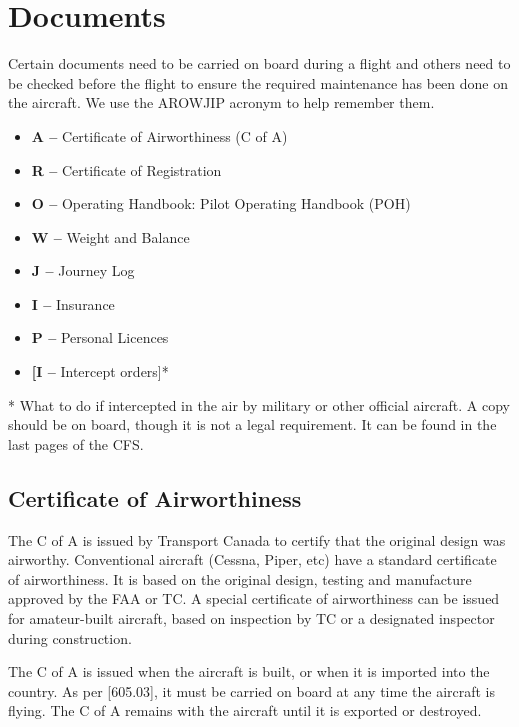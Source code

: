 \documentclass[12pt,letterpaper]{article}
\begin{document}
    \section{Documents}
    \begin{samepage}
    
    Certain documents need to be carried on board during a flight and others need to be checked before the flight to ensure the required maintenance has been done on the aircraft. We use the AROWJIP acronym to help remember them.
    
    \begin{itemize}
        \item \textbf{A --} Certificate of Airworthiness (C of A)
        \item \textbf{R --}  Certificate of Registration 
        \item \textbf{O --}  Operating Handbook:  Pilot Operating Handbook (POH)
        \item \textbf{W --}  Weight and Balance
        \item \textbf{J --}   Journey Log
        \item \textbf{I --}  Insurance
        \item \textbf{P --}  Personal Licences
        \item \textbf{[I --}   Intercept orders]*
    \end{itemize}
    
    * What to do if intercepted in the air by military or other official aircraft. A copy should be on board, though it is not a legal requirement. It can be found in the last pages of the CFS.
    \end{samepage}

    \subsection{Certificate of Airworthiness}

    The C of A is issued by Transport Canada to certify that the original design was airworthy.  Conventional aircraft (Cessna, Piper, etc) have a standard certificate of airworthiness. It is based on the original design, testing and manufacture approved by the FAA or TC. A special certificate of airworthiness can be issued for amateur-built aircraft, based on inspection by TC or a designated inspector during construction.  

    The C of A is issued when the aircraft is built, or when it is imported into the country. As per [605.03], it must be carried on board at any time the aircraft is flying. The C of A remains with the aircraft until it is exported or destroyed.
\end{document}
